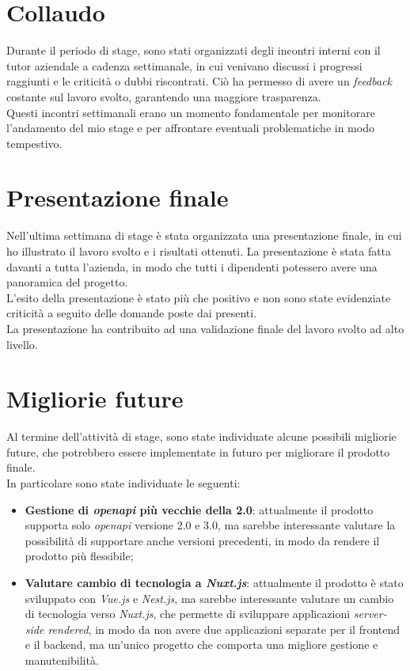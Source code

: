 \section{Collaudo}
Durante il periodo di stage, sono stati organizzati degli incontri interni con il tutor aziendale a cadenza settimanale, in cui venivano discussi i progressi
raggiunti e le criticità o dubbi riscontrati. Ciò ha permesso di avere un \textit{feedback} costante sul lavoro svolto, garantendo una maggiore trasparenza.\\
Questi incontri settimanali erano un momento fondamentale per monitorare l'andamento del mio stage e per affrontare eventuali problematiche in modo tempestivo.


\section{Presentazione finale}
Nell'ultima settimana di stage è stata organizzata una presentazione finale, in cui ho illustrato il lavoro svolto e i risultati ottenuti.
La presentazione è stata fatta davanti a tutta l'azienda, in modo che tutti i dipendenti potessero avere una panoramica del progetto.\\
L'esito della presentazione è stato più che positivo e non sono state evidenziate criticità a seguito delle domande poste dai presenti.\\
La presentazione ha contribuito ad una validazione finale del lavoro svolto ad alto livello.

\section{Migliorie future}
Al termine dell'attività di stage, sono state individuate alcune possibili migliorie future, che potrebbero essere implementate in futuro per migliorare
il prodotto finale.\\
In particolare sono state individuate le seguenti:
\begin{itemize}
  \item \textbf{Gestione di \textit{openapi} più vecchie della 2.0}: attualmente il prodotto supporta solo \textit{openapi} versione 2.0 e 3.0, ma sarebbe interessante valutare la possibilità di supportare anche versioni precedenti, in modo da rendere il prodotto più flessibile;
  \item \textbf{Valutare cambio di tecnologia a \textit{Nuxt.js}}: attualmente il prodotto è stato sviluppato con \textit{Vue.js} e \textit{Nest.js}, ma sarebbe interessante valutare un cambio di tecnologia verso \textit{Nuxt.js}, che permette di sviluppare applicazioni \textit{server-side rendered}, 
  in modo da non avere due applicazioni separate per il frontend e il backend, ma un'unico progetto che comporta una migliore gestione e manutenibilità.
\end{itemize}